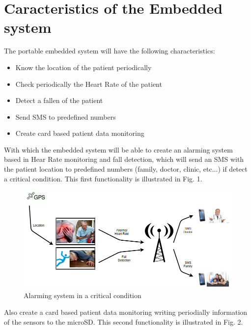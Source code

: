 \documentclass[10pt,journal,compsoc]{IEEEtran}
\begin{document}
\hfil

\section{Caracteristics of the Embedded system}

The portable embedded system will have the following characteristics:

\begin{itemize}
  \item Know the location of the patient periodically 
  \item Check periodically the Heart Rate of the patient
  \item Detect a fallen of the patient
  \item Send SMS to predefined numbers
  \item Create card based patient data monitoring
\end{itemize}

\hfil

With which the embedded system will be able to create an alarming system based in Hear Rate monitoring and fall detection, which will send an SMS with the patient location to predefined numbers (family, doctor, clinic, etc...) if detect a critical condition. This first functionality is illustrated in Fig. 1.

\begin{figure}[h]
  \centering
  \captionsetup{justification=centering}
  \includegraphics[scale=.30]{es0}
  \caption{Alarming system in a critical condition}
  \label{fig:fig1}
\end{figure}

\hfil

Also create a card based patient data monitoring writing periodially information of the sensors to the microSD. This second functionality is illustrated in Fig. 2.
\end{document}
